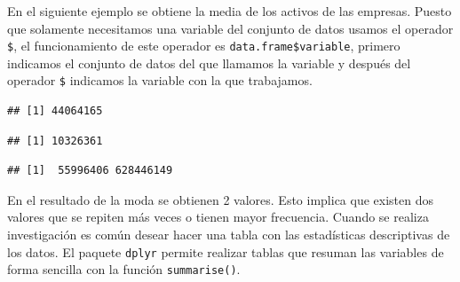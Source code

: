 \documentclass[letterpaper,]{book}
\newenvironment{Shaded}{\begin{snugshade}}{\end{snugshade}}
\newcommand{\DataTypeTok}[1]{\textcolor[rgb]{0.13,0.29,0.53}{#1}}
\newcommand{\KeywordTok}[1]{\textcolor[rgb]{0.13,0.29,0.53}{\textbf{#1}}}
\newcommand{\NormalTok}[1]{#1}
\newcommand{\OperatorTok}[1]{\textcolor[rgb]{0.81,0.36,0.00}{\textbf{#1}}}
\newcommand{\StringTok}[1]{\textcolor[rgb]{0.31,0.60,0.02}{#1}}
\begin{document}
En el siguiente ejemplo se obtiene la media de los activos de las empresas. Puesto que solamente necesitamos una variable del conjunto de datos usamos el operador \texttt{\$}, el funcionamiento de este operador es \texttt{data.frame\$variable}, primero indicamos el conjunto de datos del que llamamos la variable y después del operador \texttt{\$} indicamos la variable con la que trabajamos.

\begin{Shaded}
\end{Shaded}

\begin{verbatim}
## [1] 44064165
\end{verbatim}

\begin{Shaded}
\end{Shaded}

\begin{verbatim}
## [1] 10326361
\end{verbatim}

\begin{Shaded}
\end{Shaded}

\begin{verbatim}
## [1]  55996406 628446149
\end{verbatim}

En el resultado de la moda se obtienen 2 valores. Esto implica que existen dos valores que se repiten más veces o tienen mayor frecuencia. Cuando se realiza investigación es común desear hacer una tabla con las estadísticas descriptivas de los datos. El paquete \texttt{dplyr} permite realizar tablas que resuman las variables de forma sencilla con la función \texttt{summarise()}.

\begin{Shaded}
\end{Shaded}
\end{document}
